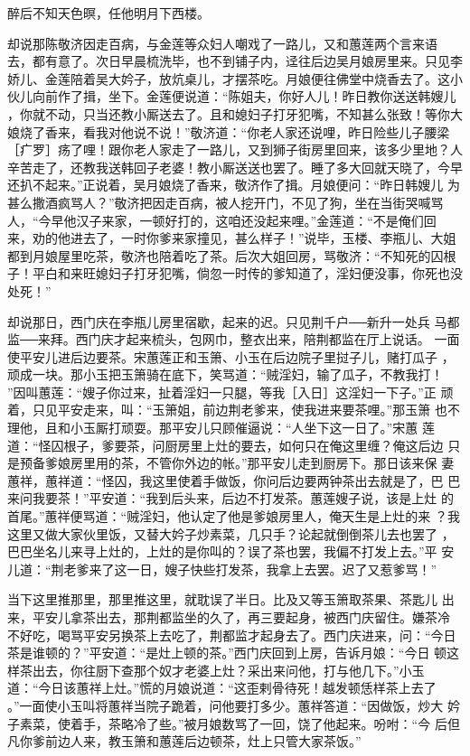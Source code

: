 醉后不知天色暝，任他明月下西楼。

却说那陈敬济因走百病，与金莲等众妇人嘲戏了一路儿，又和蕙莲两个言来语
去，都有意了。次日早晨梳洗毕，也不到铺子内，迳往后边吴月娘房里来。只见李
娇儿、金莲陪着吴大妗子，放炕桌儿，才摆茶吃。月娘便往佛堂中烧香去了。这小
伙儿向前作了揖，坐下。金莲便说道：“陈姐夫，你好人儿！昨日教你送送韩嫂儿
，你就不动，只当还教小厮送去了。且和媳妇子打牙犯嘴，不知甚么张致！等你大
娘烧了香来，看我对他说不说！”敬济道：“你老人家还说哩，昨日险些儿子腰梁
［疒罗］疡了哩！跟你老人家走了一路儿，又到狮子街房里回来，该多少里地？人
辛苦走了，还教我送韩回子老婆！教小厮送送也罢了。睡了多大回就天晓了，今早
还扒不起来。”正说着，吴月娘烧了香来，敬济作了揖。月娘便问：“昨日韩嫂儿
为甚么撒酒疯骂人？”敬济把因走百病，被人挖开门，不见了狗，坐在当街哭喊骂
人，“今早他汉子来家，一顿好打的，这咱还没起来哩。”金莲道：“不是俺们回
来，劝的他进去了，一时你爹来家撞见，甚么样子！”说毕，玉楼、李瓶儿、大姐
都到月娘屋里吃茶，敬济也陪着吃了茶。后次大姐回房，骂敬济：“不知死的囚根
子！平白和来旺媳妇子打牙犯嘴，倘忽一时传的爹知道了，淫妇便没事，你死也没
处死！”

却说那日，西门庆在李瓶儿房里宿歇，起来的迟。只见荆千户──新升一处兵
马都监──来拜。西门庆才起来梳头，包网巾，整衣出来，陪荆都监在厅上说话。
一面使平安儿进后边要茶。宋蕙莲正和玉箫、小玉在后边院子里挝子儿，赌打瓜子
，顽成一块。那小玉把玉箫骑在底下，笑骂道：“贼淫妇，输了瓜子，不教我打！
”因叫蕙莲：“嫂子你过来，扯着淫妇一只腿，等我［入日］这淫妇一下子。”正
顽着，只见平安走来，叫：“玉箫姐，前边荆老爹来，使我进来要茶哩。”那玉箫
也不理他，且和小玉厮打顽耍。那平安儿只顾催逼说：“人坐下这一日了。”宋蕙
莲道：“怪囚根子，爹要茶，问厨房里上灶的要去，如何只在俺这里缠？俺这后边
只是预备爹娘房里用的茶，不管你外边的帐。”那平安儿走到厨房下。那日该来保
妻蕙祥，蕙祥道：“怪囚，我这里使着手做饭，你问后边要两钟茶出去就是了，巴
巴来问我要茶！”平安道：“我到后头来，后边不打发茶。蕙莲嫂子说，该是上灶
的首尾。”蕙祥便骂道：“贼淫妇，他认定了他是爹娘房里人，俺天生是上灶的来
？我这里又做大家伙里饭，又替大妗子炒素菜，几只手？论起就倒倒茶儿去也罢了
，巴巴坐名儿来寻上灶的，上灶的是你叫的？误了茶也罢，我偏不打发上去。”平
安儿道：“荆老爹来了这一日，嫂子快些打发茶，我拿上去罢。迟了又惹爹骂！”

当下这里推那里，那里推这里，就耽误了半日。比及又等玉箫取茶果、茶匙儿
出来，平安儿拿茶出去，那荆都监坐的久了，再三要起身，被西门庆留住。嫌茶冷
不好吃，喝骂平安另换茶上去吃了，荆都监才起身去了。西门庆进来，问：“今日
茶是谁顿的？”平安道：“是灶上顿的茶。”西门庆回到上房，告诉月娘：“今日
顿这样茶出去，你往厨下查那个奴才老婆上灶？采出来问他，打与他几下。”小玉
道：“今日该蕙祥上灶。”慌的月娘说道：“这歪剌骨待死！越发顿恁样茶上去了
。”一面使小玉叫将蕙祥当院子跪着，问他要打多少。蕙祥答道：“因做饭，炒大
妗子素菜，使着手，茶略冷了些。”被月娘数骂了一回，饶了他起来。吩咐：“今
后但凡你爹前边人来，教玉箫和蕙莲后边顿茶，灶上只管大家茶饭。”

